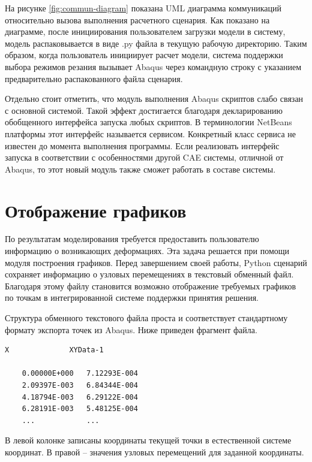 \documentclass[14pt,oneside,final]{extreport}
\begin{document}
	На рисунке \ref{fig:commun-diagram} показана UML диаграмма коммуникаций относительно вызова выполнения расчетного сценария. Как показано на диаграмме, после инициирования пользователем загрузки модели в систему, модель распаковывается в виде .py файла в текущую рабочую директорию. Таким образом, когда пользователь инициирует расчет модели, система поддержки выбора режимов резания вызывает Abaqus через командную строку с указанием предварительно распакованного файла сценария.
	
	Отдельно стоит отметить, что модуль выполнения Abaqus скриптов слабо связан с основной системой. Такой эффект достигается благодаря декларированию обобщенного интерфейса запуска любых скриптов. В терминологии NetBeans платформы этот интерфейс называется сервисом. Конкретный класс сервиса не известен до момента выполнения программы. Если реализовать интерфейс запуска в соответствии с особенностями другой CAE системы, отличной от Abaqus, то этот новый модуль также сможет работать в составе системы. 
	
	
	\section{Отображение графиков}	
	По результатам моделирования требуется предоставить пользователю информацию о возникающих деформациях. Эта задача решается при помощи модуля построения графиков. Перед завершением своей работы, Python сценарий сохраняет информацию о узловых перемещениях в текстовый обменный файл. Благодаря этому файлу становится возможно отображение требуемых графиков по точкам в интегрированной системе поддержки принятия решения.
	
	Структура обменного текстового файла проста и соответствует стандартному формату экспорта точек из Abaqus. Ниже приведен фрагмент файла. 
	\begin{lstlisting}[style=nonumbers]
	X              XYData-1
	
	0.00000E+000   7.12293E-004
	2.09397E-003   6.84344E-004
	4.18794E-003   6.29122E-004
	6.28191E-003   5.48125E-004
	... 		   ...
	\end{lstlisting}
	В левой колонке записаны координаты текущей точки в естественной системе координат. В правой -- значения узловых перемещений для заданной координаты.
	
\end{document}
